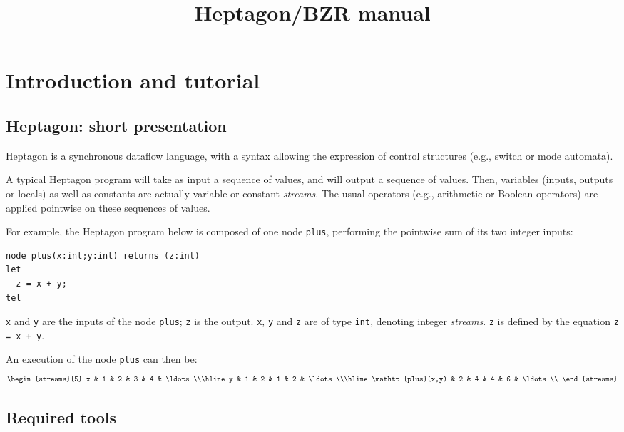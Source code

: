 \documentclass[a4paper]{article}
\title{Heptagon/BZR manual}
\author{}
\begin{document}
\maketitle

\section{Introduction and tutorial}
\label{sec:intro}

\subsection{Heptagon: short presentation}
\label{sec:hept-short-pres}

Heptagon is a synchronous dataflow language, with a syntax allowing the
expression of control structures (e.g., switch or mode automata).

A typical Heptagon program will take as input a sequence of values, and will
output a sequence of values. Then, variables (inputs, outputs or locals) as well
as constants are actually variable or constant \emph{streams}. The usual
operators (e.g., arithmetic or Boolean operators) are applied pointwise on these
sequences of values.

For example, the Heptagon program below is composed of one node \texttt{plus},
performing the pointwise sum of its two integer inputs:

\begin{lstlisting}
node plus(x:int;y:int) returns (z:int)
let
  z = x + y;
tel
\end{lstlisting}

\texttt{x} and \texttt{y} are the inputs of the node \texttt{plus}; \texttt{z}
is the output. \texttt{x}, \texttt{y} and \texttt{z} are of type \texttt{int},
denoting integer \emph{streams}. \texttt{z} is defined by the equation
\lstinline|z = x + y|.

An execution of the node \texttt{plus} can then be:
\[
\begin{streams}{5}
  x & 1 & 2 & 3 & 4 & \ldots\\\hline
  y & 1 & 2 & 1 & 2 & \ldots\\\hline
  \mathtt{plus}(x,y) & 2 & 4 & 4 & 6 & \ldots\\
\end{streams}
\]

\subsection{Required tools}
\label{sec:required-tools}
\end{document}
